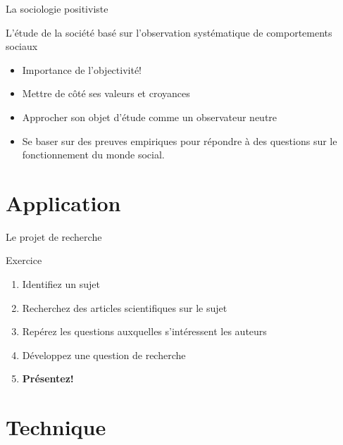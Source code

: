 \documentclass[10pt]{beamer}
\begin{document}
\begin{frame}{La sociologie positiviste}
    \begin{block}{L'étude de la société basé sur l'observation systématique de comportements sociaux}
    \end{block}
    \begin{itemize}
        \item Importance de l'objectivité!
        \item Mettre de côté ses valeurs et croyances
        \item Approcher son objet d'étude comme un observateur neutre
        \item Se baser sur des preuves empiriques pour répondre à des questions sur le fonctionnement du monde social.
    \end{itemize}

\end{frame}

\section{Application}
\begin{frame}{Le projet de recherche}
    \begin{block}{Exercice}
    \begin{enumerate}
        \item Identifiez un sujet
        \item Recherchez des articles scientifiques sur le sujet
        \item Repérez les questions auxquelles s'intéressent les auteurs
        \item Développez une question de recherche
        \item<2>[\faArrowRight~]\textbf{Présentez!}
    \end{enumerate}
    \end{block}
\end{frame}

\section{Technique}

\maketitle
\end{document}

